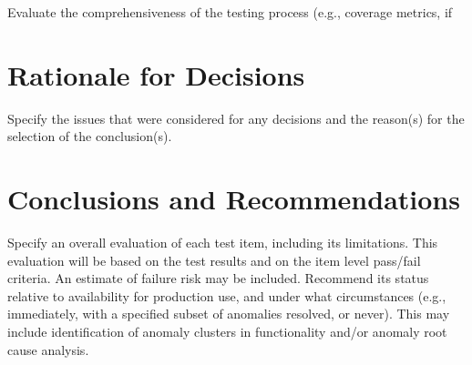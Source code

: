 Evaluate the comprehensiveness of the testing process (e.g., coverage metrics, if

\section{Rationale for Decisions}
Specify the issues that were considered for any decisions and the reason(s) for the selection of the
conclusion(s).

\section{Conclusions and Recommendations}
Specify an overall evaluation of each test item, including its limitations. This evaluation will be based
on the test results and on the item level pass/fail criteria. An estimate of failure risk may be included.
Recommend its status relative to availability for production use, and under what circumstances (e.g.,
immediately, with a specified subset of anomalies resolved, or never). This may include identification
of anomaly clusters in functionality and/or anomaly root cause analysis.
